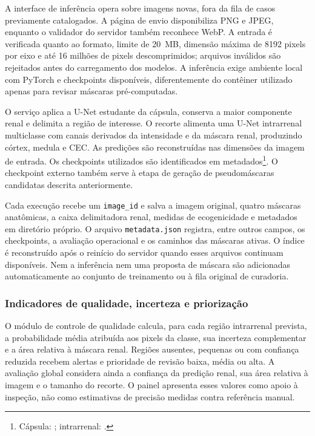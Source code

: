 \documentclass[12pt]{article}
\begin{document}
A interface de inferência opera sobre imagens novas, fora da fila de casos previamente catalogados. A página de envio disponibiliza PNG e JPEG, enquanto o validador do servidor também reconhece WebP. A entrada é verificada quanto ao formato, limite de 20~MB, dimensão máxima de 8192 pixels por eixo e até 16 milhões de pixels descomprimidos; arquivos inválidos são rejeitados antes do carregamento dos modelos. A inferência exige ambiente local com PyTorch e checkpoints disponíveis, diferentemente do contêiner utilizado apenas para revisar máscaras pré-computadas.

O serviço aplica a U-Net estudante da cápsula, conserva a maior componente renal e delimita a região de interesse. O recorte alimenta uma U-Net intrarrenal multiclasse com canais derivados da intensidade e da máscara renal, produzindo córtex, medula e CEC. As predições são reconstruídas nas dimensões da imagem de entrada. Os checkpoints utilizados são identificados em metadados\footnote{Cápsula: ; intrarrenal: .}. O checkpoint externo também serve à etapa de geração de pseudomáscaras candidatas descrita anteriormente.

Cada execução recebe um \texttt{image\_id} e salva a imagem original, quatro máscaras anatômicas, a caixa delimitadora renal, medidas de ecogenicidade e metadados em diretório próprio. O arquivo \texttt{metadata.json} registra, entre outros campos, os checkpoints, a avaliação operacional e os caminhos das máscaras ativas. O índice é reconstruído após o reinício do servidor quando esses arquivos continuam disponíveis. Nem a inferência nem uma proposta de máscara são adicionadas automaticamente ao conjunto de treinamento ou à fila original de curadoria.

\subsubsection{Indicadores de qualidade, incerteza e priorização}
\label{sec:curadoria_qualidade}

O módulo de controle de qualidade calcula, para cada região intrarrenal prevista, a probabilidade média atribuída aos pixels da classe, sua incerteza complementar e a área relativa à máscara renal. Regiões ausentes, pequenas ou com confiança reduzida recebem alertas e prioridade de revisão baixa, média ou alta. A avaliação global considera ainda a confiança da predição renal, sua área relativa à imagem e o tamanho do recorte. O painel apresenta esses valores como apoio à inspeção, não como estimativas de precisão medidas contra referência manual.
\end{document}
